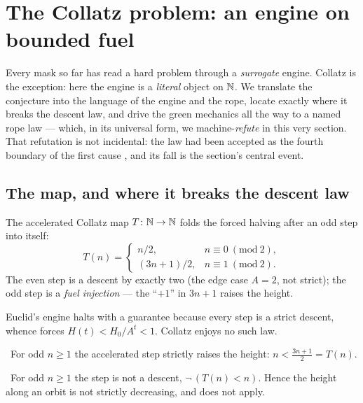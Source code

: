 \section{The Collatz problem: an engine on bounded fuel}\label{sec:collatz}

Every mask so far has read a hard problem through a \emph{surrogate} engine. Collatz is the
exception: here the engine is a \emph{literal} object on $\mathbb{N}$. We translate the conjecture into the
language of the engine and the rope, locate exactly where it breaks the descent law, and drive the
green mechanics all the way to a named rope law --- which, in its universal form, we
machine-\emph{refute} in this very section. That refutation is not incidental: the law had been
accepted as the fourth boundary of the first cause \axiom{}, and its fall is the section's central
event.

\subsection{The map, and where it breaks the descent law}

\begin{definition}\label{def:collatzMap}
The accelerated Collatz map $T\colon\mathbb{N}\to\mathbb{N}$ folds the forced halving after an odd step into itself:
\begin{equation}\label{eq:collatz-map}
T(n)=\begin{cases}n/2,& n\equiv 0\ (\mathrm{mod}\ 2),\\[2pt] (3n+1)/2,& n\equiv 1\ (\mathrm{mod}\ 2).\end{cases}
\end{equation}
The even step is a descent by exactly two (the edge case $A=2$, not strict); the odd step is a
\emph{fuel injection} --- the ``$+1$'' in $3n+1$ raises the height. 
\end{definition}

Euclid's engine halts with a guarantee because every step is a strict descent, whence
 forces $H(t)<H_0/A^{t}<1$. Collatz enjoys no such law.

\begin{theorem}\label{thm:odd_accel_ascends}
\green{}\ For odd $n\ge 1$ the accelerated step strictly raises the height: $n<\tfrac{3n+1}{2}=T(n)$.
\end{theorem}

\begin{theorem}\label{thm:not_descent_on_odd}
\green{}\ For odd $n\ge 1$ the step is not a descent, $\neg\,(T(n)<n)$. Hence the height along an orbit
is not strictly decreasing, and  does not apply.
\end{theorem}

